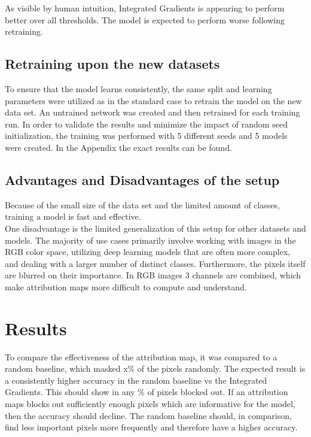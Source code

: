 \documentclass[conference]{IEEEtran}
\begin{document}
 As visible by human intuition, Integrated Gradients is appearing to perform better over all thresholds. The model is expected to perform worse following retraining.

\subsection{Retraining upon the new datasets}

To ensure that the model learns consistently, the same split and learning parameters were utilized as in the standard case to retrain the model on the new data set. An untrained network was created and then retrained for each training run. In order to validate the results and minimize the impact of random seed initialization, the training was performed with 5 different seeds and 5 models were created. In the Appendix the exact results can be found. 

\subsection{Advantages and Disadvantages of the setup}

Because of the small size of the data set and the limited amount of classes, training a model is fast and effective. \\
One disadvantage is the limited generalization of this setup for other datasets and models. The majority of use cases primarily involve working with images in the RGB color space, utilizing deep learning models that are often more complex, and dealing with a larger number of distinct classes. Furthermore, the pixels itself are blurred on their importance. In RGB images 3 channels are combined, which make attribution maps more difficult to compute and understand. 


\section{Results}

To compare the effectiveness of the attribution map, it was compared to a random baseline, which masked x\% of the pixels randomly. The expected result is a consistently higher accuracy in the random baseline vs the Integrated Gradients. This should show in any \% of pixels blocked out.
If an attribution maps blocks out sufficiently enough pixels which are informative for the model, then the accuracy should decline. The random baseline should, in comparison, find less important pixels more frequently and therefore have a higher accuracy.
\end{document}
